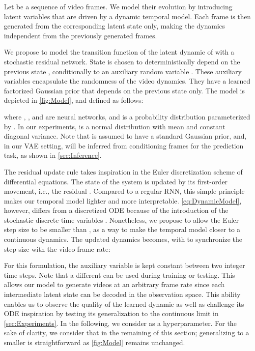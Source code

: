 \documentclass{article}
\begin{document}
Let  be a sequence of  video frames.
We model their evolution by introducing latent variables  that are driven by a dynamic temporal model.
Each frame  is then generated from the corresponding latent state  only, making the dynamics independent from the previously generated frames.

We propose to model the transition function of the latent dynamic of  with a stochastic residual network.
State  is chosen to deterministically depend on the previous state , conditionally to an auxiliary random variable .
These auxiliary variables encapsulate the randomness of the video dynamics.
They have a learned factorized Gaussian prior that depends on the previous state only.
The model is depicted in \cref{fig:Model}, and defined as follows:

where , ,  and  are neural networks, and  is a probability distribution parameterized by .
In our experiments,  is a normal distribution with mean  and constant diagonal variance.
Note that  is assumed to have a standard Gaussian prior, and, in our VAE setting, will be inferred from conditioning frames for the prediction task, as shown in \cref{sec:Inference}.

The residual update rule takes inspiration in the Euler discretization scheme of differential equations.
The state of the system  is updated by its first-order movement, i.e., the residual .
Compared to a regular RNN, this simple principle makes our temporal model lighter and more interpretable.
\cref{eq:DynamicModel}, however, differs from a discretized ODE because of the introduction of the stochastic discrete-time variables .
Nonetheless, we propose to allow the Euler step size  to be smaller than , as a way to make the temporal model closer to a continuous dynamics.
The updated dynamics becomes, with  to synchronize the step size with the video frame rate:

For this formulation, the auxiliary variable  is kept constant between two integer time steps.
Note that a different  can be used during training or testing.
This allows our model to generate videos at an arbitrary frame rate since each intermediate latent state can be decoded in the observation space.
This ability enables us to observe the quality of the learned dynamic as well as challenge its ODE inspiration by testing its generalization to the continuous limit in \cref{sec:Experiments}.
In the following, we consider  as a hyperparameter.
For the sake of clarity, we consider that  in the remaining of this section; generalizing to a smaller  is straightforward as \cref{fig:Model} remains unchanged.
\end{document}
